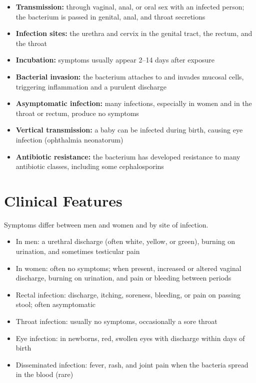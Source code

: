 \begin{itemize}
    \item \textbf{Transmission:} through vaginal, anal, or oral sex with an infected person; the bacterium is passed in genital, anal, and throat secretions
    \item \textbf{Infection sites:} the urethra and cervix in the genital tract, the rectum, and the throat
    \item \textbf{Incubation:} symptoms usually appear 2--14 days after exposure
    \item \textbf{Bacterial invasion:} the bacterium attaches to and invades mucosal cells, triggering inflammation and a purulent discharge
    \item \textbf{Asymptomatic infection:} many infections, especially in women and in the throat or rectum, produce no symptoms
    \item \textbf{Vertical transmission:} a baby can be infected during birth, causing eye infection (ophthalmia neonatorum)
    \item \textbf{Antibiotic resistance:} the bacterium has developed resistance to many antibiotic classes, including some cephalosporins
\end{itemize}

\section*{Clinical Features}
Symptoms differ between men and women and by site of infection.

\begin{itemize}
    \item In men: a urethral discharge (often white, yellow, or green), burning on urination, and sometimes testicular pain
    \item In women: often no symptoms; when present, increased or altered vaginal discharge, burning on urination, and pain or bleeding between periods
    \item Rectal infection: discharge, itching, soreness, bleeding, or pain on passing stool; often asymptomatic
    \item Throat infection: usually no symptoms, occasionally a sore throat
    \item Eye infection: in newborns, red, swollen eyes with discharge within days of birth
    \item Disseminated infection: fever, rash, and joint pain when the bacteria spread in the blood (rare)
\end{itemize}

